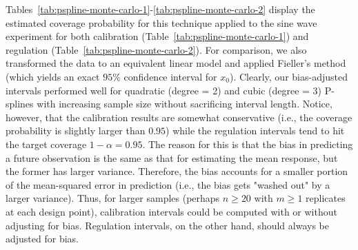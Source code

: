 \documentclass[cmfont,usenames,dvipsnames,leqno]{afit-etd}\usepackage[]{graphicx}\usepackage[]{color}
\begin{document}
Tables~\ref{tab:pspline-monte-carlo-1}-\ref{tab:pspline-monte-carlo-2} display the estimated coverage probability for this technique applied to the sine wave experiment for both calibration (Table~\ref{tab:pspline-monte-carlo-1}) and regulation (Table~\ref{tab:pspline-monte-carlo-2}). For comparison, we also transformed the data to an equivalent linear model and applied Fieller's method (which yields an exact $95\%$ confidence interval for $x_0$). Clearly, our bias-adjusted intervals performed well for quadratic (degree = 2) and cubic (degree = 3) \ac{P-spline}s with increasing sample size without sacrificing interval length. Notice, however, that the calibration results are somewhat conservative (i.e., the coverage probability is slightly larger than $0.95$) while the regulation intervals tend to hit the target coverage $1-\alpha = 0.95$. The reason for this is that the bias in predicting a future observation is the same as that for estimating the mean response, but the former has larger variance. Therefore, the bias accounts for a smaller portion of the mean-squared error in prediction (i.e., the bias gets "washed out" by a larger variance). Thus, for larger samples (perhaps $n \ge 20$ with $m \ge 1$ replicates at each design point), calibration intervals could be computed with or without adjusting for bias. Regulation intervals, on the other hand, should always be adjusted for bias.
\end{document}
